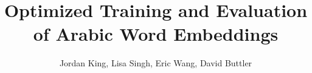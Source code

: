 \documentclass{sig-alternate}
\theoremstyle{definition}
\begin{document}
\title{Optimized Training and Evaluation of Arabic Word Embeddings}
\author{Jordan King, Lisa Singh, Eric Wang, David Buttler}

\maketitle











\addtolength{\bibsep}{-5pt}

\begin{small}
  
\end{small}
\end{document}
